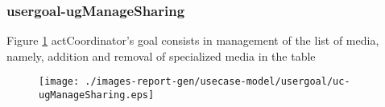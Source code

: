 \subsubsection{usergoal-ugManageSharing}

\label{RE-use-case-ugManageSharing}



Figure \ref{fig:lu.uni.lassy.excalibur.icrash-spec-RE-UCD-uc-ugManageSharing}
actCoordinator's goal consists in management of the list of media, namely, addition and removal of specialized media in the table

\begin{figure}[htbp]
\begin{center}

\texttt{[image: ./images-report-gen/usecase-model/usergoal/uc-ugManageSharing.eps]}
\end{center}
\caption[lu.uni.lassy.excalibur.icrash-spec Use Case Diagram: uc-ugManageSharing]{}
\label{fig:lu.uni.lassy.excalibur.icrash-spec-RE-UCD-uc-ugManageSharing}
\end{figure}
\vspace{0.5cm}
